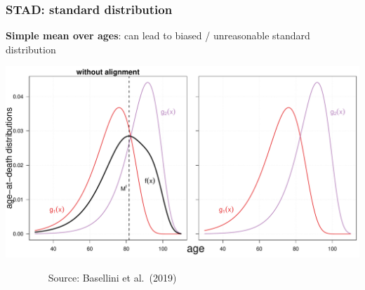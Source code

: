 \documentclass[12pt, xcolor=table]{beamer}  %
\begin{document}
\begin{frame}[noframenumbering]\frametitle{STAD: standard distribution}

\vspace{-0.3cm}
	
	\begin{center}
		
		\textbf{Simple mean over ages}: can lead to biased / unreasonable standard distribution 
		
		\vspace{0.3cm}
		
		\includegraphics[scale=.35]{Figures/Ch2/F8_2.pdf}
		
	\end{center}

\vspace{-0.15cm}
\scriptsize{$\quad\quad\quad\quad$ Source: Basellini et al.~(2019)}

	
\end{frame}	
\end{document}
